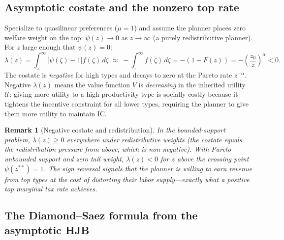 \documentclass[12pt]{article}
\newtheorem{remark}{Remark}
\newcommand{\calU}{\mathcal{U}}
\newcommand{\zlow}{z_{0}}
\begin{document}
\subsection{Asymptotic costate and the nonzero top rate}

Specialize to quasilinear preferences ($\mu = 1$) and assume the planner
places zero welfare weight on the top: $\psi(z) \to 0$ as $z\to\infty$ (a
purely redistributive planner).  For $z$ large enough that $\psi(z) = 0$:
\begin{equation}\label{eq:pareto_lambda}
  \lambda(z) = \int_z^\infty \bigl[\psi(\zeta)-1\bigr] f(\zeta)\,d\zeta
  \;\approx\; -\int_z^\infty f(\zeta)\,d\zeta
  = -(1-F(z))
  = -\!\left(\frac{\zlow}{z}\right)^\alpha < 0.
\end{equation}
The costate is \emph{negative} for high types and decays to zero at the Pareto
rate $z^{-\alpha}$.  Negative $\lambda(z)$ means the value function $V$ is
\emph{decreasing} in the inherited utility $\calU$: giving more utility to a
high-productivity type is socially costly because it tightens the incentive
constraint for all lower types, requiring the planner to give them more utility
to maintain IC.

\medskip
\begin{remark}[Negative costate and redistribution]
In the bounded-support problem, $\lambda(z) \geq 0$ everywhere under
redistributive weights (the costate equals the redistribution pressure from
above, which is non-negative).  With Pareto unbounded support and zero tail
weight, $\lambda(z) < 0$ for $z$ above the crossing point $\psi(z^{**}) = 1$.
The sign reversal signals that the planner is willing to earn revenue from top
types at the cost of distorting their labor supply---exactly what a positive
top marginal tax rate achieves.
\end{remark}

\subsection{The Diamond--Saez formula from the asymptotic HJB}
\end{document}
